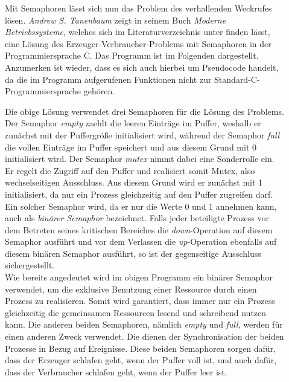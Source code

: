 \begin{description}
\begin{description}
							\item[{\parbox[t]{1.2\linewidth}{Lösung des Erzeuger-Verbraucher-Problems unter Ver-\\wendung von Semaphoren}}] %
							
								Mit Semaphoren lässt sich nun das Problem des verhallenden Weckrufes lösen. \textit{Andrew S. Tanenbaum} zeigt in seinem Buch \textit{Moderne Betriebssysteme}, welches sich im Literaturverzeichnis unter \cite{ModerneBetriebssysteme} finden lässt, eine Lösung des Erzeuger-Verbraucher-Problems mit Semaphoren in der Programmiersprache C. Das Programm ist im Folgenden dargestellt. Anzumerken ist wieder, dass es sich auch hierbei um Pseudocode handelt, da die im Programm aufgerufenen Funktionen nicht zur Standard-C-Programmiersprache gehören.
								
								
								
								Die obige Lösung verwendet drei Semaphoren für die Lösung des Problems. Der Semaphor \textit{empty} zaehlt die leeren Einträge im Puffer, weshalb er zunächst mit der Puffergröße initialisiert wird, während der Semaphor \textit{full} die vollen Einträge im Puffer speichert und aus diesem Grund mit 0 initialisiert wird. Der Semaphor \textit{mutex} nimmt dabei eine Sonderrolle ein. Er regelt die Zugriff auf den Puffer und realisiert somit Mutex, also wechselseitigen Ausschluss. Aus diesem Grund wird er zunächst mit 1 initialisiert, da nur ein Prozess gleichzeitig auf den Puffer zugreifen darf. Ein solcher Semaphor wird, da er nur die Werte 0 und 1 annehmen kann, auch als \textit{binärer Semaphor} bezeichnet. Falls jeder beteiligte Prozess vor dem Betreten seines kritischen Bereiches die \textit{down}-Operation auf diesem Semaphor ausführt und vor dem Verlassen die \textit{up}-Operation ebenfalls auf diesem binären Semaphor ausführt, so ist der gegenseitige Ausschluss sichergestellt.\\
								Wie bereits angedeutet wird im obigen Programm ein binärer Semaphor verwendet, um die exklusive Benutzung einer Ressource durch einen Prozess zu realisieren. Somit wird garantiert, dass immer nur ein Prozess gleichzeitig die gemeinsamen Ressourcen lesend und schreibend nutzen kann. Die anderen beiden Semaphoren, nämlich \textit{empty} und \textit{full}, werden für einen anderen Zweck verwendet. Die dienen der Synchronisation der beiden Prozesse in Bezug auf Ereignisse. Diese beiden Semaphoren sorgen dafür, dass der Erzeuger schlafen geht, wenn der Puffer voll ist, und auch dafür, dass der Verbraucher schlafen geht, wenn der Puffer leer ist. \cite{ModerneBetriebssysteme}
						\end{description}
					

\end{description}
